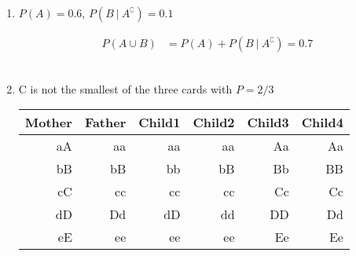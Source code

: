 \begin{enumerate}
	
	\item $ P(A) = 0.6 $, $ P(B\ |\ A^\complement) = 0.1 $
	
	\begin{align}
		P(A \cup B) &= P(A) + P(B\ |\ A^\complement) = 0.7
	\end{align} \\ 
	
	\item C is not the smallest of the three cards with $ P = 2/3 $
	
	\begin{table}[H]
		\centering
		\begin{tabular}{@{}rr|rrrr@{}}
			\toprule
			Mother & Father & Child1 & Child2 & Child3 & Child4 \\ \midrule
			aA     & aa		& aa	 & aa 	  & Aa 	   & Aa   \\
			bB     & bB     & bb	 & bB 	  & Bb 	   & BB    \\
			cC     & cc     & cc	 & cc 	  & Cc 	   & Cc    \\
			dD     & Dd     & dD	 & dd 	  & DD 	   & Dd    \\
			eE     & ee     & ee	 & ee 	  & Ee 	   & Ee    \\ \bottomrule
		\end{tabular}
	\end{table}
	
	
	
\end{enumerate} 